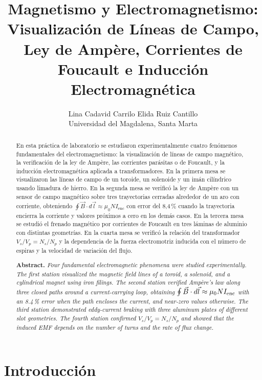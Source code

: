 \documentclass[11pt,twocolumn]{article}
\title{\large\bfseries Magnetismo y Electromagnetismo: Visualizaci\'on de L\'ineas de Campo, Ley de Amp\`ere, Corrientes de Foucault e Inducci\'on Electromagn\'etica}
\author{
  Lina Cadavid Carrilo \quad Elida Ruiz Cantillo\\[4pt]
  {\small Universidad del Magdalena, Santa Marta}
}
\date{}
\begin{document}
\maketitle
\thispagestyle{plain}

\begin{abstract}
En esta pr\'actica de laboratorio se estudiaron experimentalmente cuatro fen\'omenos fundamentales del electromagnetismo: la visualizaci\'on de l\'ineas de campo magn\'etico, la verificaci\'on de la ley de Amp\`ere, las corrientes par\'asitas o de Foucault, y la inducci\'on electromagn\'etica aplicada a transformadores. En la primera mesa se visualizaron las l\'ineas de campo de un toroide, un solenoide y un im\'an cil\'indrico usando limadura de hierro. En la segunda mesa se verific\'o la ley de Amp\`ere con un sensor de campo magn\'etico sobre tres trayectorias cerradas alrededor de un aro con corriente, obteniendo $\oint \vec{B} \cdot d\vec{l} \approx \mu_0 N I_{\text{enc}}$ con error del 8,4\,\% cuando la trayectoria encierra la corriente y valores pr\'oximos a cero en los dem\'as casos. En la tercera mesa se estudi\'o el frenado magn\'etico por corrientes de Foucault en tres l\'aminas de aluminio con distintas geometr\'ias. En la cuarta mesa se verific\'o la relaci\'on del transformador $V_s/V_p = N_s/N_p$ y la dependencia de la fuerza electromotriz inducida con el n\'umero de espiras y la velocidad de variaci\'on del flujo.

\vspace{4pt}
\noindent\textbf{Abstract.}\; \textit{Four fundamental electromagnetic phenomena were studied experimentally. The first station visualized the magnetic field lines of a toroid, a solenoid, and a cylindrical magnet using iron filings. The second station verified Amp\`ere's law along three closed paths around a current-carrying loop, obtaining $\oint\vec{B}\cdot d\vec{l}\approx\mu_0 NI_{\rm enc}$ with an 8.4\,\% error when the path encloses the current, and near-zero values otherwise. The third station demonstrated eddy-current braking with three aluminum plates of different slot geometries. The fourth station confirmed $V_s/V_p = N_s/N_p$ and showed that the induced EMF depends on the number of turns and the rate of flux change.}
\end{abstract}

\section{Introducci\'on}
\end{document}
